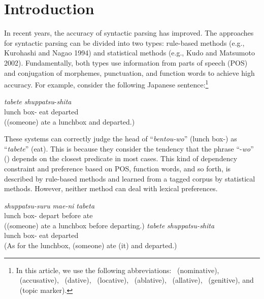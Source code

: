 \documentclass[english]{jnlp_1.4_rep}
\newcommand{\nom}{}
\newcommand{\acc}{}
\newcommand{\dat}{}
\newcommand{\abl}{}
\newcommand{\gen}{}
\newcommand{\loc}{}
\newcommand{\all}{}
\newcommand{\TOP}{}
\begin{document}
\maketitle

\section{Introduction}

In recent years, the accuracy of syntactic parsing has improved. The
approaches for syntactic parsing can be divided into two types:
    rule-based methods (e.g., Kurohashi and Nagao 1994\nocite{Kurohashi1994}) and statistical methods
    (e.g., Kudo and Matsumoto 2002\nocite{Kudo2002}). Fundamentally, both types use information from
parts of speech (POS) and conjugation of morphemes, punctuation, and
function words to achieve high accuracy. For example, consider the
following Japanese sentence:\footnote{In this article, we use the
following abbreviations: \nom~(nominative), \acc~(accusative),
\dat~(dative), \loc~(locative), \abl~(ablative), \all~(allative),
\gen~(genitive), and \TOP~(topic marker).}

\begin{exe}
\ex \label{ExampleSimple}
  {\textit{tabete}} {\textit{shuppatsu}-\textit{shita}} \\
      {lunch box-\acc} {eat} {departed} \\
 \trans ((someone) ate a lunchbox and departed.)
\end{exe}

These systems can correctly judge the head of ``\textit{bentou-wo}''
(lunch box-\acc) as ``\textit{tabete}'' (eat).  This is because they
consider the tendency that the phrase ``-\textit{wo}'' (\acc) depends on
the closest predicate in most cases. This kind of dependency constraint
and preference based on POS, function words, and so forth, is described
by rule-based methods and learned from a tagged corpus by statistical
methods. However, neither method can deal with lexical preferences.

\begin{exe}
\ex \label{ExampleLexPref}
 \begin{xlist}
 \ex
   {\textit{shuppatsu-suru}} {\textit{mae-ni}} {\textit{tabeta}} \\
      {lunch box-\acc} {depart} {before} {ate} \\
  \trans ((someone) ate a lunchbox before departing.)
 \ex
   {\textit{tabete}} {\textit{shuppatsu-shita}} \\
      {lunch box-\TOP} {eat} {departed} \\
  \trans (As for the lunchbox, (someone) ate (it) and departed.)
 \end{xlist}
\end{exe}
\end{document}
